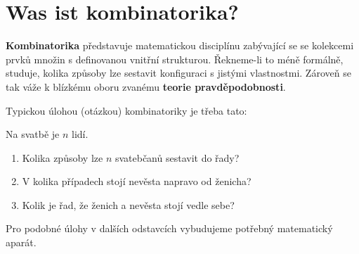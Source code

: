 \section{Was ist kombinatorika?}

\textbf{Kombinatorika} představuje matematickou disciplínu zabývající se se kolekcemi prvků množin s definovanou vnitřní strukturou. Řekneme-li to méně formálně, studuje, kolika způsoby lze sestavit konfiguraci s jistými vlastnostmi. Zároveň se tak váže k blízkému oboru zvanému \textbf{teorie pravděpodobnosti}. \par
Typickou úlohou (otázkou) kombinatoriky je třeba tato:

\begin{exercise}
    Na svatbě je $n$ lidí.
    \begin{enumerate}[label=(\alph*)]
        \item Kolika způsoby lze $n$ svatebčanů sestavit do řady?
        \item V kolika případech stojí nevěsta napravo od ženicha?
        \item Kolik je řad, že ženich a nevěsta stojí vedle sebe?
    \end{enumerate}
\end{exercise}

Pro podobné úlohy v dalších odstavcích vybudujeme potřebný matematický aparát.